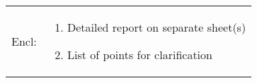 \begin{table}[h]
\begin{center}
\begin{tabular}{r  l}
   \begin{minipage}{0.075\textwidth}
\begin{flushleft}
Encl: \bigskip \bigskip
\end{flushleft}
\end{minipage}
&
\begin{minipage}{0.925\textwidth}
\begin{flushright}
\begin{enumerate}[label=\alph*., left=0pt, labelsep=.5em, itemsep=0.25em] \item Detailed report on separate sheet(s) \item List of points for clarification \end{enumerate}
\end{flushright}
\end{minipage}
\end{tabular}
\end{center}
\end{table}
